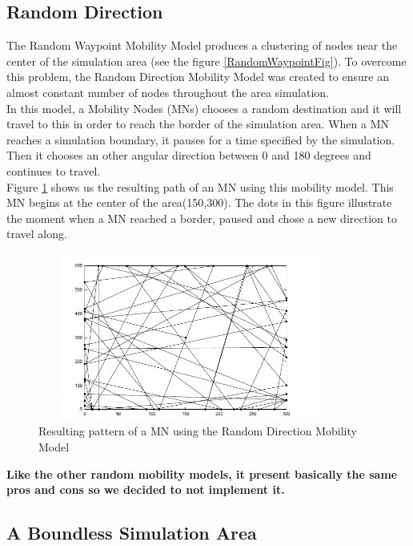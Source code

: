 \subsection{Random Direction}

The Random Waypoint Mobility Model produces a clustering of nodes near the center of the simulation area (see the figure \ref{RandomWaypointFig}). To overcome this problem, the Random Direction Mobility Model was created to ensure an almost constant number of nodes throughout the area simulation.\\ 
In this model, a Mobility Nodes (MNs) chooses a random destination and it will travel to this in order to reach the border of the simulation area. When a MN reaches a simulation boundary, it pauses for a time specified by the simulation. Then it chooses an other angular direction between 0 and 180 degrees and continues to travel.\\ 
Figure \ref{RandomDirectionFig} shows us the resulting path of an MN using this mobility model. This MN begins at the center of the area(150,300). The dots in this figure illustrate the moment when a MN reached a border, paused and chose a new direction to travel along.\\

\begin{figure}[h]
\center
\includegraphics[width=10cm,height=55mm]{../images/randomdirection1.png}
\caption{\label{RandomDirectionFig}Resulting pattern of a MN using the Random Direction Mobility Model\cite{SurveyMobilityModelsAdHoc1}}
\end{figure}

\textbf{Like the other random mobility models, it present basically the same pros and cons so we decided to not implement it.}

\newpage

\subsection{A Boundless Simulation Area}

